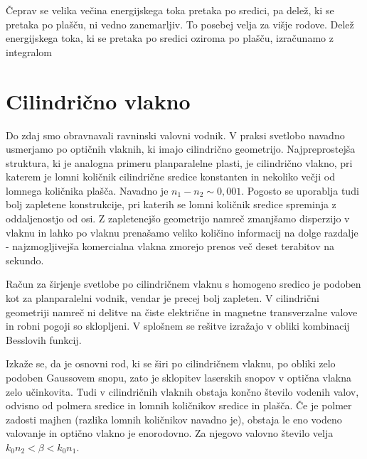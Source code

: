 Čeprav se velika večina energijskega toka pretaka po sredici, pa delež, ki se 
pretaka po plašču, ni vedno zanemarljiv. To posebej velja za višje rodove. 
Delež energijskega toka, ki se pretaka po sredici oziroma po plašču, izračunamo
z integralom

\section{Cilindrično vlakno}
\label{chap:Cilinder}
Do zdaj smo obravnavali ravninski valovni vodnik. V praksi svetlobo
navadno usmerjamo po optičnih vlaknih, ki imajo cilindrično geometrijo.
Najpreprostejša struktura, ki je analogna primeru planparalelne
plasti, je cilindrično vlakno, pri katerem je lomni količnik cilindrične
sredice konstanten in nekoliko večji od lomnega količnika plašča. Navadno je 
$n_1 - n_2 \sim 0,001$. Pogosto se uporablja
tudi bolj zapletene konstrukcije, pri katerih se lomni količnik sredice spreminja z
oddaljenostjo od osi. Z zapletenejšo geometrijo namreč zmanjšamo disperzijo v vlaknu in lahko 
po vlaknu prenašamo veliko količino informacij na dolge razdalje - najzmogljivejša komercialna vlakna
zmorejo prenos več deset terabitov na sekundo. 

Račun za širjenje svetlobe po cilindričnem vlaknu s homogeno sredico
je podoben kot za planparalelni vodnik, vendar je precej bolj
zapleten. V cilindrični geometriji namreč ni delitve na čiste električne in 
magnetne transverzalne valove in robni pogoji so sklopljeni. V splošnem se rešitve izražajo 
v obliki kombinacij Besslovih funkcij. 

Izkaže se, da je osnovni rod, ki se širi po cilindričnem vlaknu, po obliki zelo podoben
Gaussovem snopu, zato je sklopitev laserskih snopov v optična vlakna zelo učinkovita.
Tudi v cilindričnih vlaknih obstaja končno število vodenih valov, odvisno od polmera sredice in
lomnih količnikov sredice in plašča. Če je polmer zadosti majhen (razlika lomnih
količnikov navadno je), obstaja le eno vodeno valovanje in optično vlakno je enorodovno. 
Za njegovo valovno število velja $k_{0} n_{2}<\beta<k_{0} n_{1}$. 

